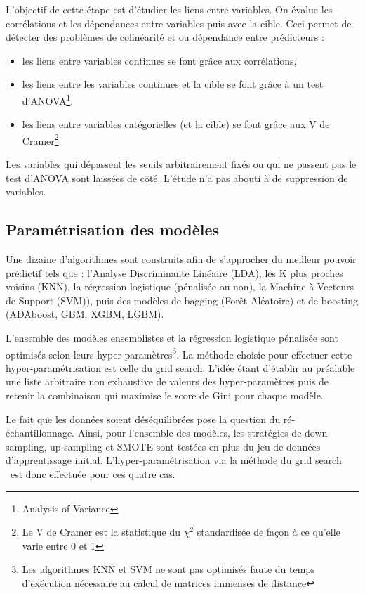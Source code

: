 \documentclass[french]{article}
\begin{document}
\begin{multicols}{2}
L'objectif de cette étape est d'étudier les liens entre variables. On évalue les corrélations et les dépendances entre variables puis avec la cible. Ceci permet de détecter des problèmes de colinéarité et ou dépendance entre prédicteurs :

\begin{itemize}
    \item les liens entre variables continues se font grâce aux corrélations,
    \item les liens entre les variables continues et la cible se font grâce à un test d'ANOVA\footnote{Analysis of Variance},
    \item les liens entre variables catégorielles (et la cible) se font grâce aux V de Cramer\footnote{Le V de Cramer est la statistique du $\chi^2$ standardisée de façon à ce qu'elle varie entre 0 et 1}.
\end{itemize}

Les variables qui dépassent les seuils arbitrairement fixés ou qui ne passent pas le test d'ANOVA sont laissées de côté. L'étude n'a pas abouti à de suppression de variables.

\subsection{Paramétrisation des modèles}

Une dizaine d'algorithmes sont construits afin de s'approcher du meilleur pouvoir prédictif tels que : l'Analyse Discriminante Linéaire (LDA), les K plus proches voisins (KNN), la régression logistique (pénalisée ou non), la Machine à Vecteurs de Support (SVM)), puis des modèles de bagging (Forêt Aléatoire) et de boosting (ADAboost, GBM, XGBM, LGBM).

L'ensemble des modèles ensemblistes et la régression logistique pénalisée sont optimisés selon leurs hyper-paramètres\footnote{Les algorithmes KNN et SVM ne sont pas optimisés faute du temps d'exécution nécessaire au calcul de matrices immenses de distance}. La méthode choisie pour effectuer cette hyper-paramétrisation est celle du \og grid search\fg. L'idée étant d'établir au préalable une liste arbitraire non exhaustive de valeurs des hyper-paramètres puis de retenir la combinaison qui maximise le score de Gini pour chaque modèle. 

Le fait que les données soient déséquilibrées pose la question du ré-échantillonnage. Ainsi, pour l'ensemble des modèles, les stratégies de down-sampling, up-sampling et SMOTE sont testées en plus du jeu de données d'apprentissage initial. L'hyper-paramétrisation via la méthode du \og grid search \fg   \ est donc effectuée pour ces quatre cas.




\end{multicols}
\end{document}
